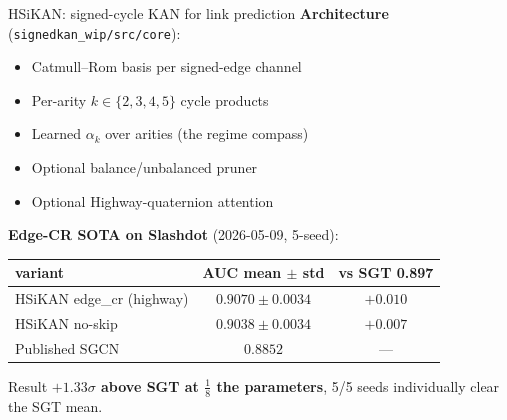 \documentclass[aspectratio=169, 11pt]{beamer}
\begin{document}
\begin{frame}{HSiKAN: signed-cycle KAN for link prediction}
  \textbf{Architecture} (\texttt{signedkan\_wip/src/core}):
  \begin{itemize}
  \item Catmull--Rom basis per signed-edge channel
  \item Per-arity $k \in \{2,3,4,5\}$ cycle products
  \item Learned $\alpha_k$ over arities (the regime compass)
  \item Optional balance/unbalanced pruner
  \item Optional Highway-quaternion attention
  \end{itemize}

  \vspace{2mm}
  \textbf{Edge-CR SOTA on Slashdot} (2026-05-09, 5-seed):
  \begin{center}
  \begin{tabular}{lcc}
  \toprule
  variant & AUC mean $\pm$ std & vs SGT 0.897 \\
  \midrule
  HSiKAN edge\_cr (highway) & $0.9070 \pm 0.0034$ & $+0.010$ \\
  HSiKAN no-skip            & $0.9038 \pm 0.0034$ & $+0.007$ \\
  Published SGCN            & $0.8852$            & --- \\
  \bottomrule
  \end{tabular}
  \end{center}

  \begin{block}{Result}
  \textbf{$+1.33\sigma$ above SGT at $\frac{1}{8}$ the parameters},
  5/5 seeds individually clear the SGT mean.
  \end{block}
\end{frame}
\end{document}
